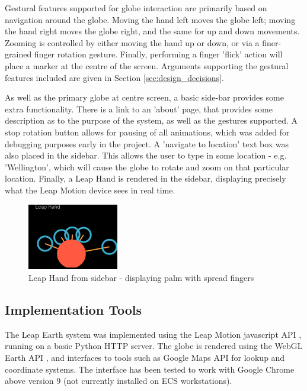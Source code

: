 \documentclass{sigplanconf}
\begin{document}
Gestural features supported for globe interaction are primarily based on navigation around the globe. Moving the hand left moves the globe left; moving the hand right moves the globe right, and the same for up and down movements. Zooming is controlled by either moving the hand up or down, or via a finer-grained finger rotation gesture. Finally, performing a finger 'flick' action will place a marker at the centre of the screen. Arguments supporting the gestural features included are given in Section \ref{sec:design_decisions}.

As well as the primary globe at centre screen, a basic side-bar provides some extra functionality. There is a link to an 'about' page, that provides some description as to the purpose of the system, as well as the gestures supported. A stop rotation button allows for pausing of all animations, which was added for debugging purposes early in the project. A 'navigate to location' text box was also placed in the sidebar. This allows the user to type in some location - e.g. 'Wellington', which will cause the globe to rotate and zoom on that particular location. Finally, a Leap Hand is rendered in the sidebar, displaying precisely what the Leap Motion device sees in real time. 

\begin{center}
\begin{figure}[h!]
\centering
\includegraphics[width=150px]{images/palm_spread_zoom.png}
\caption{Leap Hand from sidebar - displaying palm with spread fingers}
\label{fig:halo_comparison}
\vspace{-10pt}
\end{figure}
\end{center}

\subsection{Implementation Tools}

The Leap Earth system was implemented using the Leap Motion javascript API \cite{leap_js}, running on a basic Python HTTP server. The globe is rendered using the WebGL Earth API \cite{web_gl_api}, and interfaces to tools such as Google Maps API \cite{google_map_js_api} for lookup and coordinate systems. The interface has been tested to work with Google Chrome above version 9 (not currently installed on ECS workstations).
\end{document}
